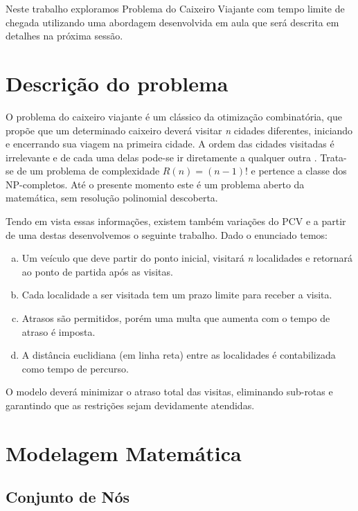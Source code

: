 \documentclass[12pt]{article}
\begin{document}
Neste trabalho exploramos Problema do Caixeiro Viajante com tempo limite de chegada utilizando uma abordagem desenvolvida em aula que será descrita em detalhes na próxima sessão.



\section{Descrição do problema}

O problema do caixeiro viajante é um clássico da otimização combinatória, que propõe que um determinado caixeiro deverá visitar {\it n} cidades diferentes, iniciando e encerrando sua viagem na primeira cidade. A ordem das cidades visitadas é irrelevante e de cada uma delas pode-se ir diretamente a qualquer outra \cite{porto-da-silveira_2000}. Trata-se de um problema de complexidade $R(n) = (n -1)!$ e pertence a classe dos NP-completos. Até o presente momento este é um problema aberto da matemática, sem resolução polinomial descoberta.

Tendo em vista essas informações, existem também variações do PCV e a partir de uma destas desenvolvemos o seguinte trabalho. Dado o enunciado temos:


\begin{enumerate}[(a)]
  \item Um veículo que deve partir do ponto inicial, visitará {\it n} localidades e retornará ao ponto de partida após as visitas.
  \item Cada localidade a ser visitada tem um prazo limite para receber a visita.
  \item Atrasos são permitidos, porém uma multa que aumenta com o tempo de atraso é imposta.
  \item A distância euclidiana (em linha reta) entre as localidades é contabilizada como tempo de percurso.
\end{enumerate}

O modelo deverá minimizar o atraso total das visitas, eliminando sub-rotas e garantindo que as restrições sejam devidamente atendidas.


\section{Modelagem Matemática}

\subsection{Conjunto de Nós}
\end{document}
